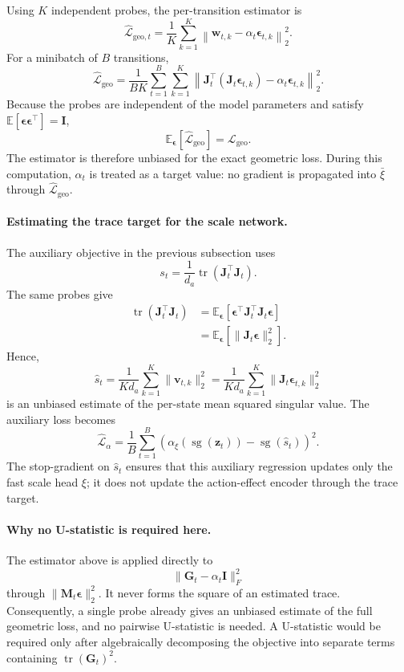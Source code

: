 ﻿\documentclass{article}
\begin{document}
Using \(K\) independent probes, the per-transition estimator is
\[
\widehat{\mathcal{L}}_{\mathrm{geo},t}
=
\frac{1}{K}
\sum_{k=1}^{K}
\left\|
\mathbf{w}_{t,k}
-
\alpha_t\bm{\epsilon}_{t,k}
\right\|_2^2.
\]
For a minibatch of \(B\) transitions,
\[
\boxed{
\widehat{\mathcal{L}}_{\mathrm{geo}}
=
\frac{1}{BK}
\sum_{t=1}^{B}
\sum_{k=1}^{K}
\left\|
\mathbf{J}_t^{\top}
\left(
\mathbf{J}_t\bm{\epsilon}_{t,k}
\right)
-
\alpha_t\bm{\epsilon}_{t,k}
\right\|_2^2
}.
\]
Because the probes are independent of the model parameters and satisfy
\(\mathbb{E}[\bm{\epsilon}\bm{\epsilon}^{\top}]=\mathbf{I}\),
\[
\mathbb{E}_{\bm{\epsilon}}
\left[
\widehat{\mathcal{L}}_{\mathrm{geo}}
\right]
=
\mathcal{L}_{\mathrm{geo}}.
\]
The estimator is therefore unbiased for the exact geometric loss. During
this computation, \(\alpha_t\) is treated as a target value: no gradient is
propagated into \(\bar\xi\) through
\(\widehat{\mathcal{L}}_{\mathrm{geo}}\).

\paragraph{Estimating the trace target for the scale network.}
The auxiliary objective in the previous subsection uses
\[
s_t
=
\frac{1}{d_a}
\operatorname{tr}
\left(
\mathbf{J}_t^{\top}\mathbf{J}_t
\right).
\]
The same probes give
\[
\begin{aligned}
\operatorname{tr}
\left(
\mathbf{J}_t^{\top}\mathbf{J}_t
\right)
&=
\mathbb{E}_{\bm{\epsilon}}
\left[
\bm{\epsilon}^{\top}
\mathbf{J}_t^{\top}\mathbf{J}_t
\bm{\epsilon}
\right] \\
&=
\mathbb{E}_{\bm{\epsilon}}
\left[
\|\mathbf{J}_t\bm{\epsilon}\|_2^2
\right].
\end{aligned}
\]
Hence,
\[
\boxed{
\widehat{s}_t
=
\frac{1}{Kd_a}
\sum_{k=1}^{K}
\|\mathbf{v}_{t,k}\|_2^2
=
\frac{1}{Kd_a}
\sum_{k=1}^{K}
\|\mathbf{J}_t\bm{\epsilon}_{t,k}\|_2^2
}
\]
is an unbiased estimate of the per-state mean squared singular value. The
auxiliary loss becomes
\[
\widehat{\mathcal{L}}_{\alpha}
=
\frac{1}{B}
\sum_{t=1}^{B}
\left(
\alpha_{\xi}
\left(
\operatorname{sg}(\mathbf{z}_t)
\right)
-
\operatorname{sg}(\widehat{s}_t)
\right)^2.
\]
The stop-gradient on \(\widehat{s}_t\) ensures that this auxiliary
regression updates only the fast scale head \(\xi\); it does not update the
action-effect encoder through the trace target.

\paragraph{Why no U-statistic is required here.}
The estimator above is applied directly to
\[
\|\mathbf{G}_t-\alpha_t\mathbf{I}\|_F^2
\]
through \(\|\mathbf{M}_t\bm{\epsilon}\|_2^2\). It never forms the square of
an estimated trace. Consequently, a single probe already gives an unbiased
estimate of the full geometric loss, and no pairwise U-statistic is needed.
A U-statistic would be required only after algebraically decomposing the
objective into separate terms containing
\(\operatorname{tr}(\mathbf{G}_t)^2\).
\end{document}

